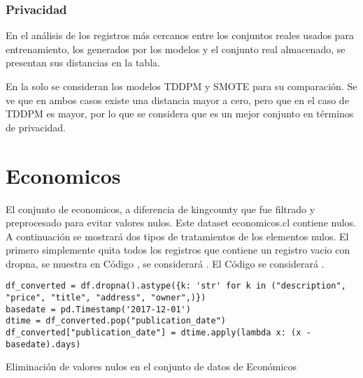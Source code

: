 

\newpage
\subsubsection{Privacidad}
En el análisis de los registros más cercanos entre los conjuntos reales usados para entrenamiento, los generados por los modelos y el conjunto real almacenado, se presentan sus distancias en la tabla.



%
%
%

En la  solo se consideran los modelos TDDPM y SMOTE para su comparación. Se ve que en ambos casos existe una distancia mayor a cero, pero que en el caso de TDDPM es mayor, por lo que se considera que es un mejor conjunto en términos de privacidad.




\newpage
\section{Economicos}
El conjunto de economicos, a diferencia de kingcounty que fue filtrado y preprocesado para evitar valores nulos. Este dataset economicos.cl contiene nulos. A continuación se mostrará dos tipos de tratamientos de los elementos nulos. El primero simplemente quita todos los registros que contiene un registro vacio con dropna, se muestra en Código , se considerará . El Código  se considerará .


\begin{listing}[H]
    \begin{verbatim}
df_converted = df.dropna().astype({k: 'str' for k in ("description", "price", "title", "address", "owner",)})
basedate = pd.Timestamp('2017-12-01')
dtime = df_converted.pop("publication_date")
df_converted["publication_date"] = dtime.apply(lambda x: (x - basedate).days)
    \end{verbatim}
\caption{Eliminación de valores nulos en el conjunto de datos de Económicos}
\label{codigo-remove-nan}
\end{listing}

